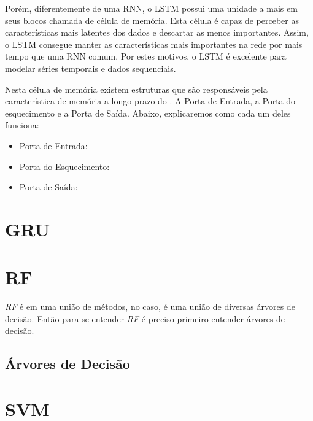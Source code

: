 
Porém, diferentemente de uma \acrshort{RNN}, o LSTM possui uma unidade a mais em seus blocos chamada de célula de memória. Esta célula é capaz de perceber as características mais latentes dos dados e descartar as menos importantes. Assim, o \acrshort{LSTM} consegue manter as características mais importantes na rede por mais tempo que uma \acrfull{RNN} comum. Por estes motivos, o \acrshort{LSTM} é excelente para modelar séries temporais e dados sequenciais.

Nesta célula de memória existem estruturas que são responsáveis pela característica de memória a longo prazo do \arcshort[LSTM]. A Porta de Entrada, a Porta do esquecimento e a Porta de Saída. Abaixo, explicaremos como cada um deles funciona:

\begin{itemize}
  \item Porta de Entrada: 
  \item Porta do Esquecimento: 
  \item Porta de Saída:
\end{itemize}


\section{\acrfull{GRU}}

\section{\acrfull{RF}}

\textit{\acrshort{RF}} é em uma união de métodos, no caso, é uma união de diversas árvores de decisão. Então para se entender \textit{\acrshort{RF}} é preciso primeiro entender árvores de decisão.

\subsection{Árvores de Decisão}



\section{\acrfull{SVM}}


